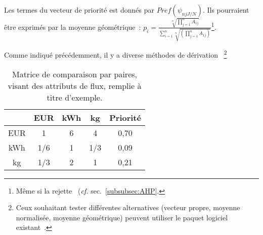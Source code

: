 Les termes du vecteur de priorité est donnés par
$\mathit{Pref}(\psi_{njJ/N})$.
Ils pourraient être exprimés par la moyenne géométrique~:
$		{p_i}=\displaystyle\frac{\sqrt[n]{\prod_{j=1}^{n}{A_{1j}}}}{\sum_{i=1}^{n}\sqrt[n]{(\prod_{j=1}^{n}{A_{1j}})}}
$\footnote{Même si \citeauthor{saaty_making_2005} la rejette~\cite[6. Non-additive Synthesis-Why the Geometric Mean Does not Work]{saaty_making_2005} (\textit{cf.} sec.~\ref{subsubsec:AHP}.}.

Comme indiqué précédemment, il y a diverse méthodes de dérivation~\cite{ishizaka_how_2006}
\footnote{
Ceux souhaitant tester différentes alternatives (vecteur propre, moyenne normalisée, moyenne géométrique) peuvent utiliser le paquet logiciel existant~\cite{glur_ahp_2016}.
}

\begin{table}[h]
  \begin{center}  
  \begin{tabular}{| c|c |c |c |c|}
  \hline
 & EUR & kWh & kg & Priorité \\ 
 \hline
EUR & 1     & 6     & 4     & 0,70 \\ 
kWh &  1/6 & 1     &  1/3 & 0,09 \\ 
kg &  1/3 & 2     & 1     & 0,21 \\ 
  \hline
  \end{tabular}
  \end{center}
    \caption{Matrice de comparaison par paires, visant des attributs de flux, remplie à titre d'exemple.}
  \label{tab:exemple_3_attributs}
  \end{table}

